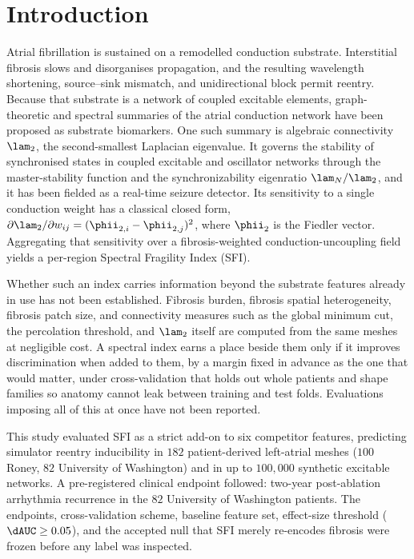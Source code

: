 ﻿\section{Introduction}
Atrial fibrillation is sustained on a remodelled conduction substrate.
Interstitial fibrosis slows and disorganises propagation, and the resulting
wavelength shortening, source--sink mismatch, and unidirectional block permit
reentry. Because that substrate is a network of coupled excitable elements,
graph-theoretic and spectral summaries of the atrial conduction network have
been proposed as substrate biomarkers. One such summary is algebraic
connectivity $\lam_2$, the second-smallest Laplacian
eigenvalue.\cite{fiedler1973} It governs the stability of synchronised states in
coupled excitable and oscillator networks through the master-stability
function\cite{pecora1998} and the synchronizability
eigenratio $\lam_N/\lam_2$,\cite{barahona2002} and it has been fielded as a
real-time seizure detector.\cite{bomela2020} Its sensitivity to a single
conduction weight has a classical closed form,
$\partial\lam_2/\partial w_{ij}=(\phii_{2,i}-\phii_{2,j})^2$,\cite{ghosh2006}
where $\phii_2$ is the Fiedler vector. Aggregating that
sensitivity over a fibrosis-weighted conduction-uncoupling field yields a
per-region Spectral Fragility Index (SFI).

Whether such an index carries information beyond the substrate features already
in use has not been established. Fibrosis burden, fibrosis spatial
heterogeneity, fibrosis patch size, and connectivity measures such as the global
minimum cut, the percolation threshold, and $\lam_2$ itself are computed from
the same meshes at negligible cost. A spectral index earns a place beside them
only if it improves discrimination when added to them, by a margin fixed in
advance as the one that would matter, under cross-validation that holds out
whole patients and shape families so anatomy cannot leak between training and
test folds. Evaluations imposing all of this at once have not been reported.

This study evaluated SFI as a strict add-on to six competitor features,
predicting simulator reentry inducibility in $182$ patient-derived left-atrial
meshes ($100$ Roney\cite{roney2022}, $82$ University of
Washington\cite{uwboyle2025}) and in up to $100{,}000$ synthetic excitable
networks. A pre-registered clinical endpoint followed: two-year post-ablation
arrhythmia recurrence in the $82$ University of Washington patients. The
endpoints, cross-validation scheme, baseline feature set, effect-size threshold
($\dAUC\geq 0.05$), and the accepted null that SFI merely re-encodes fibrosis
were frozen before any label was inspected.
